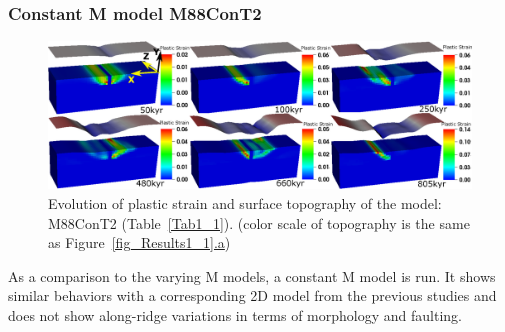 \subsubsection{Constant M model M88ConT2}
\begin{figure}[h]
  \centering
    \includegraphics[width=1.0\textwidth]{./Figures/fig_Results1_3.eps}
  \caption{Evolution of plastic strain and surface topography of the model: M88ConT2 (Table~\hyperref[Tab1_1]{\ref{Tab1_1}}). (color scale of topography is the same as Figure~\hyperref[fig_Results1_1]{\ref{fig_Results1_1}.a})}
 \label{fig_Results1_3}
\end{figure}   

As a comparison to the varying M models, a constant M model is run. It shows similar behaviors with a corresponding 2D model from the previous studies and does not show along-ridge variations in terms of morphology and faulting.

